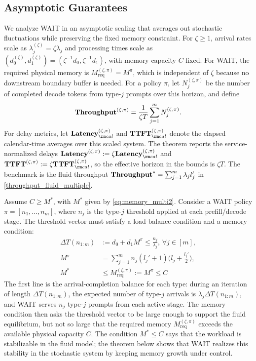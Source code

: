 \subsection{Asymptotic Guarantees}
\label{subsec:asymptotic_analysis}
\label{subsec:main_theorem}
We analyze WAIT in an asymptotic scaling that averages out stochastic fluctuations while preserving the fixed memory constraint. For \(\zeta\ge 1\), arrival rates scale as \(\lambda_j^{(\zeta)}=\zeta\lambda_j\) and processing times scale as \((d_0^{(\zeta)},d_1^{(\zeta)})=(\zeta^{-1}d_0,\zeta^{-1}d_1)\), with memory capacity \(C\) fixed. For WAIT, the required physical memory is \(M_{\mathrm{req}}^{(\zeta,\pi)}=M^\pi\), which is independent of \(\zeta\) because no downstream boundary buffer is needed. For a policy \(\pi\), let \(N_j^{(\zeta,\pi)}\) be the number of completed decode tokens from type-\(j\) prompts over this horizon, and define
\[
\textbf{Throughput}^{(\zeta, \pi)} = \frac{1}{\zeta T} \sum_{j=1}^m N_j^{(\zeta, \pi)}.
\]
For delay metrics, let \(\Latency_{\rm cal}^{(\zeta,\pi)}\) and \(\TTFT_{\rm cal}^{(\zeta,\pi)}\) denote the elapsed calendar-time averages over this scaled system. The theorem reports the service-normalized delays \(\Latency^{(\zeta,\pi)}:=\zeta\Latency_{\rm cal}^{(\zeta,\pi)}\) and \(\TTFT^{(\zeta,\pi)}:=\zeta\TTFT_{\rm cal}^{(\zeta,\pi)}\), so the effective horizon in the bounds is \(\zeta T\). The benchmark is the fluid throughput \(\textbf{Throughput}^*=\sum_{j=1}^m \lambda_j l_j'\) in \eqref{throughput_fluid_multiple}.

Assume \(C \ge M^*\), with \(M^*\) given by \eqref{eq:memory_multi2}. Consider a WAIT policy \(\pi=[n_1,\dots,n_m]\), where \(n_j\) is the type-\(j\) threshold applied at each prefill/decode stage. The threshold vector must satisfy a load-balance condition and a memory condition:
\begin{equation}
\label{eq:wait_thresholds}
\begin{aligned}
\Delta T(n_{1:m}) &:= d_0 + d_1 M^\pi \leq \tfrac{n_j}{\lambda_j},\, \forall j\in[m],\\
 M^\pi &= \sum_{j=1}^m n_j (l_j' + 1) \big(l_j + \tfrac{l_j'}{2}\big),\\
 M^* &\leq M_{\mathrm{req}}^{(\zeta,\pi)}:=M^\pi \leq C
\end{aligned}
\end{equation}
The first line is the arrival-completion balance for each type: during an iteration of length \(\Delta T(n_{1:m})\), the expected number of type-\(j\) arrivals is \(\lambda_j\Delta T(n_{1:m})\), and WAIT serves \(n_j\) type-\(j\) prompts from each active stage. The memory condition then asks the threshold vector to be large enough to support the fluid equilibrium, but not so large that the required memory \(M_{\mathrm{req}}^{(\zeta,\pi)}\) exceeds the available physical capacity \(C\). The condition \(M^*\le C\) says that the workload is stabilizable in the fluid model; the theorem below shows that WAIT realizes this stability in the stochastic system by keeping memory growth under control.

